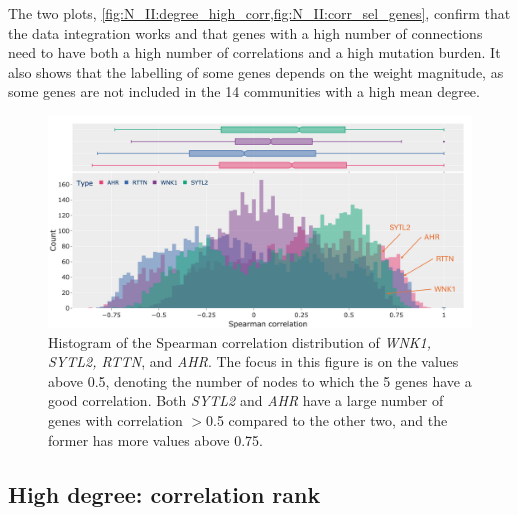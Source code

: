The two plots, \cref{fig:N_II:degree_high_corr,fig:N_II:corr_sel_genes}, confirm that the data integration works and that genes with a high number of connections need to have both a high number of correlations and a high mutation burden. It also shows that the labelling of some genes depends on the weight magnitude, as some genes are not included in the 14 communities with a high mean degree.


\begin{figure}[H]    
    \centering
    \includegraphics[width=1.0\textwidth,height=1.0\textheight,keepaspectratio]{Sections/Network_II/resources/reward/hist_corr_labels.png}
    \caption{Histogram of the Spearman correlation distribution of \textit{WNK1, SYTL2, RTTN}, and \textit{AHR}. The focus in this figure is on the values above 0.5, denoting the number of nodes to which the 5 genes have a good correlation. Both \textit{SYTL2} and \textit{AHR} have a large number of genes with correlation $>$0.5 compared to the other two, and the former has more values above 0.75. }
    \label{fig:N_II:corr_sel_genes}
\end{figure}


\subsection{High degree: correlation rank} \label{s:N_II:corr_rank}



